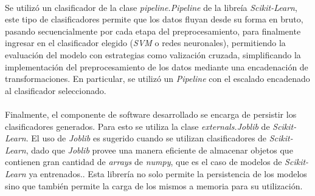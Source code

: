 \paragraph{} Se utilizó un clasificador de la clase \textit{pipeline.Pipeline}\cite{Pipeline-scikit-learn} de la libreía \textit{Scikit-Learn}, este tipo de clasificadores permite que los datos fluyan desde su forma en bruto, pasando secuencialmente por cada etapa del preprocesamiento, para finalmente ingresar en el clasificador elegido (\textit{SVM} o redes neuronales), permitiendo la evaluación del modelo con estrategias como valización cruzada, simplificando la implementación del preprocesamiento de los datos mediante una encadenación de transformaciones. En particular, se utilizó un \textit{Pipeline} con el escalado encadenado al clasificador seleccionado. 

\paragraph{} Finalmente, el componente de software desarrollado se encarga de persistir los clasificadores generados. Para esto se utiliza la clase \textit{externals.Joblib} de \textit{Scikit-Learn}. El uso de \textit{Joblib} es sugerido cuando se utilizan clasificadores de \textit{Scikit-Learn}, dado que \textit{Joblib} provee una manera eficiente de almacenar objetos que contienen gran cantidad de \textit{arrays} de \textit{numpy}\cite{numpy}, que es el caso de modelos de \textit{Scikit-Learn} ya entrenados.\cite{persistence}. Esta librería no solo permite la persistencia de los modelos sino que también permite la carga de los mismos a memoria para su utilización.

